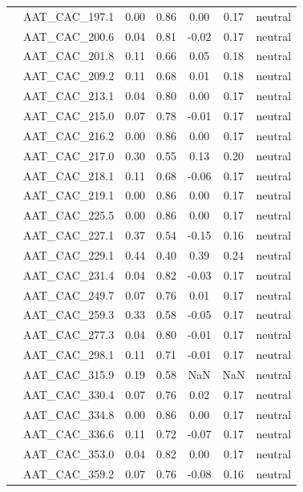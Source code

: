 \documentclass[11pt,]{article}
\begin{document}
\begin{longtable}[c]{@{}lcccccc@{}}
& AAT\_CAC\_197.1 & 0.00 & 0.86 & 0.00 & 0.17 & neutral
\\\addlinespace
& AAT\_CAC\_200.6 & 0.04 & 0.81 & -0.02 & 0.17 & neutral
\\\addlinespace
& AAT\_CAC\_201.8 & 0.11 & 0.66 & 0.05 & 0.18 & neutral
\\\addlinespace
& AAT\_CAC\_209.2 & 0.11 & 0.68 & 0.01 & 0.18 & neutral
\\\addlinespace
& AAT\_CAC\_213.1 & 0.04 & 0.80 & 0.00 & 0.17 & neutral
\\\addlinespace
& AAT\_CAC\_215.0 & 0.07 & 0.78 & -0.01 & 0.17 & neutral
\\\addlinespace
& AAT\_CAC\_216.2 & 0.00 & 0.86 & 0.00 & 0.17 & neutral
\\\addlinespace
& AAT\_CAC\_217.0 & 0.30 & 0.55 & 0.13 & 0.20 & neutral
\\\addlinespace
& AAT\_CAC\_218.1 & 0.11 & 0.68 & -0.06 & 0.17 & neutral
\\\addlinespace
& AAT\_CAC\_219.1 & 0.00 & 0.86 & 0.00 & 0.17 & neutral
\\\addlinespace
& AAT\_CAC\_225.5 & 0.00 & 0.86 & 0.00 & 0.17 & neutral
\\\addlinespace
& AAT\_CAC\_227.1 & 0.37 & 0.54 & -0.15 & 0.16 & neutral
\\\addlinespace
& AAT\_CAC\_229.1 & 0.44 & 0.40 & 0.39 & 0.24 & neutral
\\\addlinespace
& AAT\_CAC\_231.4 & 0.04 & 0.82 & -0.03 & 0.17 & neutral
\\\addlinespace
& AAT\_CAC\_249.7 & 0.07 & 0.76 & 0.01 & 0.17 & neutral
\\\addlinespace
& AAT\_CAC\_259.3 & 0.33 & 0.58 & -0.05 & 0.17 & neutral
\\\addlinespace
& AAT\_CAC\_277.3 & 0.04 & 0.80 & -0.01 & 0.17 & neutral
\\\addlinespace
& AAT\_CAC\_298.1 & 0.11 & 0.71 & -0.01 & 0.17 & neutral
\\\addlinespace
& AAT\_CAC\_315.9 & 0.19 & 0.58 & NaN & NaN & neutral
\\\addlinespace
& AAT\_CAC\_330.4 & 0.07 & 0.76 & 0.02 & 0.17 & neutral
\\\addlinespace
& AAT\_CAC\_334.8 & 0.00 & 0.86 & 0.00 & 0.17 & neutral
\\\addlinespace
& AAT\_CAC\_336.6 & 0.11 & 0.72 & -0.07 & 0.17 & neutral
\\\addlinespace
& AAT\_CAC\_353.0 & 0.04 & 0.82 & 0.00 & 0.17 & neutral
\\\addlinespace
& AAT\_CAC\_359.2 & 0.07 & 0.76 & -0.08 & 0.16 & neutral

\end{longtable}
\end{document}
